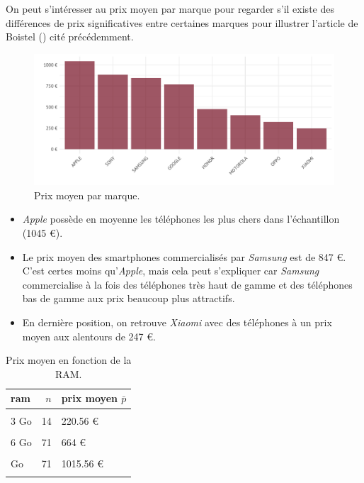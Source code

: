 \documentclass[
  12pt,
]{report}
\begin{document}
On peut s'intéresser au prix moyen par marque pour regarder s'il existe
des différences de prix significatives entre certaines marques pour
illustrer l'article de Boistel () cité
précédemment.

\begin{figure}[H]

{\centering \includegraphics{report_files/figure-pdf/fig_mean_price-1.pdf}

}

\caption{Prix moyen par marque.}

\end{figure}%

\begin{itemize}
\item
  \emph{Apple} possède en moyenne les téléphones les plus chers dans
  l'échantillon (1045 €).
\item
  Le prix moyen des smartphones commercialisés par \emph{Samsung} est de
  847 €. C'est certes moins qu'\emph{Apple}, mais cela peut s'expliquer
  car \emph{Samsung} commercialise à la fois des téléphones très haut de
  gamme et des téléphones bas de gamme aux prix beaucoup plus
  attractifs.
\item
  En dernière position, on retrouve \emph{Xiaomi} avec des téléphones à
  un prix moyen aux alentours de 247 €.
\end{itemize}

\newpage

\begin{table}[!h]
\centering
\caption{\label{tab:kable_1}Prix moyen en fonction de la RAM.}
\centering
\begin{tabular}[t]{lrl}
\toprule
\textbf{ram} & \textbf{$n$} & \textbf{prix moyen $\bar p$}\\
\midrule
\cellcolor{gray!10}{2 Go} & \cellcolor{gray!10}{14} & \cellcolor{gray!10}{95.86 €}\\
3 Go & 14 & 220.56 €\\
\cellcolor{gray!10}{4 Go} & \cellcolor{gray!10}{105} & \cellcolor{gray!10}{402.31 €}\\
6 Go & 71 & 664 €\\
\cellcolor{gray!10}{8 Go} & \cellcolor{gray!10}{155} & \cellcolor{gray!10}{758.59 €}\\
\addlinespace
12 Go & 71 & 1015.56 €\\
\cellcolor{gray!10}{16 Go} & \cellcolor{gray!10}{2} & \cellcolor{gray!10}{1499 €}\\
\bottomrule
\end{tabular}
\end{table}
\end{document}
